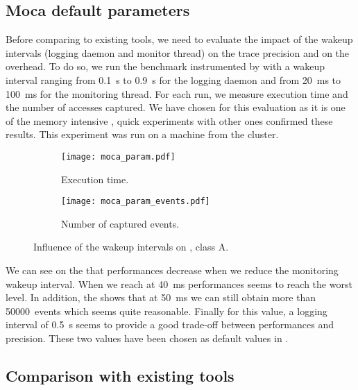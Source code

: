\subsection{Moca default parameters}
\label{sec:expe-param}

Before comparing \Moca to existing tools, we need to evaluate the impact of
the wakeup intervals (logging daemon and monitor thread) on the trace
precision and on the overhead. To do so, we run the \IS benchmark instrumented by \Moca with
a wakeup interval ranging from \SI{0.1}{s} to  \SI{0.9}{s} for the logging daemon and from \SI{20}{ms} to
\SI{100}{ms} for the monitoring thread. For each run, we measure \IS execution time and the number of
accesses captured. We have chosen \IS for this evaluation as it is one of the memory intensive \NPB,
quick experiments with other ones confirmed these results. This experiment was
run on a machine from the \Edel cluster.

\begin{figure}[htb]
    \centering
    \begin{subfigure}{\linewidth}
        \texttt{[image: moca\_param.pdf]}
        \caption{Execution time.}
        \label{fig:param_time}
    \end{subfigure}
    \begin{subfigure}{\linewidth}
        \texttt{[image: moca\_param\_events.pdf]}
        \caption{Number of captured events.}
        \label{fig:param_evts}
    \end{subfigure}
    \caption{Influence of the wakeup intervals on \IS, class A.}
    \label{fig:param}
\end{figure}

We can see on the  that performances decrease when we
reduce the monitoring wakeup interval. When we reach at \SI{40}{ms}
performances seems to reach the worst level. In addition, the
 shows that at \SI{50}{ms} we can still obtain more than
\SI{50000}{events} which seems quite reasonable. Finally for this value, a logging
interval of \SI{0.5}{s} seems to provide a good trade-off  between
performances and precision.
These two values have been chosen as default values in \Moca.



\subsection{Comparison with existing tools}
\label{sec:expe-ovh}

